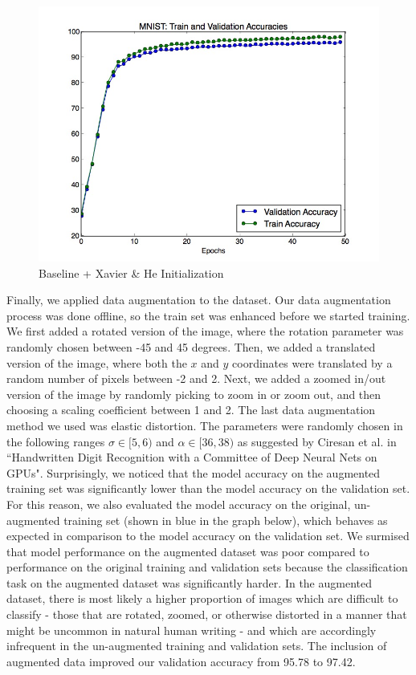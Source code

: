 \documentclass[a4paper]{article}
\begin{document}
\begin{enumerate}
{\begin{figure}[H]
  \includegraphics[width=12cm]{../plots/accuracies_xavier.jpg}
  \centering
  \caption{Baseline + Xavier \& He Initialization}
  \label{fig:boat1}
\end{figure}

Finally, we applied data augmentation to the dataset. Our data augmentation process was done offline, so the train set was enhanced before we started training. We first added a rotated version of the image, where the rotation parameter was randomly chosen between -45 and 45 degrees. Then, we added a translated version of the image, where both the $x$ and $y$ coordinates were translated by a random number of pixels between -2 and 2. Next, we added a zoomed in/out version of the image by randomly picking to zoom in or zoom out, and then choosing a scaling coefficient between 1 and 2. The last data augmentation method we used was elastic distortion. The parameters were randomly chosen in the following ranges $\sigma \in [5,6)$ and $\alpha \in [36,38)$ as suggested by Ciresan et al. in ``Handwritten Digit Recognition with a Committee of Deep Neural Nets on GPUs".
\newline
\newline
Surprisingly, we noticed that the model accuracy on the augmented training set was significantly lower than the model accuracy on the validation set. For this reason, we also evaluated the model accuracy on the original, un-augmented training set (shown in blue in the graph below), which behaves as expected in comparison to the model accuracy on the validation set. We surmised that model performance on the augmented dataset was poor compared to performance on the original training and validation sets because the classification task on the augmented dataset was significantly harder. In the augmented dataset, there is most likely a higher proportion of images which are difficult to classify - those that are rotated, zoomed, or otherwise distorted in a manner that might be uncommon in natural human writing - and which are accordingly infrequent in the un-augmented training and validation sets.  The inclusion of augmented data improved our validation accuracy from 95.78 to 97.42.

}
\end{enumerate}
\end{document}
